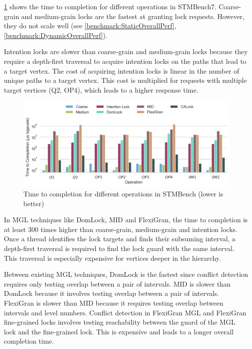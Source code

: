 \cref{ttc} shows the time to completion for different operations in STMBench7. 
Coarse-grain and medium-grain locks are the fastest at granting lock requests. However, they do not scale well (see \cref{benchmark:StaticOverallPerf}, \cref{benchmark:DynamicOverallPerf}). 

Intention locks are slower than coarse-grain and medium-grain locks because they require a depth-first traversal to acquire intention locks on the paths that lead to a target vertex. The cost of acquiring intention locks is linear in the number of unique paths to a target vertex. This cost is multiplied for requests with multiple target vertices (Q2, OP4), which leads to a higher response time. 

\begin{figure}[h]
	\captionsetup{justification=centering}
	\centering
	\includegraphics[width=\columnwidth]{figures/PerformanceCharts/TTC}
	\caption{Time to completion for different operations in STMBench (lower is better)}
	\label{ttc}
\end{figure}

In MGL techniques like DomLock, MID and FlexiGran, the time to completion is at least 300 times higher than coarse-grain, medium-grain and intention locks. Once a thread identifies the lock targets and finds their subsuming interval, a depth-first traversal is required to find the lock guard with the same interval. This traversal is especially expensive for vertices deeper in the hierarchy.


Between existing MGL techniques, DomLock is the fastest since conflict detection requires only testing overlap between a pair of intervals. MID is slower than DomLock because it involves testing overlap between a pair of intervals. FlexiGran is slower than MID because it requires testing overlap between intervals and level numbers. Conflict detection in FlexiGran MGL and FlexiGran fine-grained locks involves testing reachability between the guard of the MGL lock and the fine-grained lock. This is expensive and leads to a longer overall completion time.

